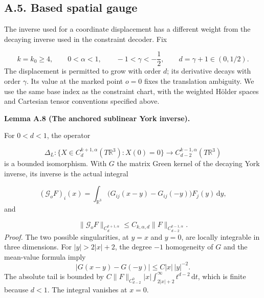 \documentclass[
  english,
  11pt,
  reqno]{amsart}
\makeatletter
\newcommand{\pandocstatementheading}[1]{%
  \par\addpenalty{\@beginparpenalty}%
  \addvspace{.5\baselineskip plus .2\baselineskip minus .2\baselineskip}%
  {\normalfont\bfseries #1\par}%
  \nobreak\@afterindenttrue\@afterheading
}
\makeatother
\begin{document}
\subsection{A.5. Based spatial gauge}\label{a.5.-based-spatial-gauge}\label{sec:online-anchored-spatial-gauge}

The inverse used for a coordinate displacement has a different weight
from the decaying inverse used in the constraint decoder. Fix

\label{eq:online-gauge-fixed-weights} \[
k=k_0\ge4,\qquad 0<\alpha<1,\qquad -1<\gamma<-\frac12,
\qquad d=\gamma+1\in(0,1/2).
\] The displacement is permitted to grow with order \(d\); its
derivative decays with order \(\gamma\). Its value at the marked point
\(o=0\) fixes the translation ambiguity. We use the same base index as
the constraint chart, with the weighted Hölder spaces and Cartesian
tensor conventions specified above.

\pandocstatementheading{\leavevmode{}\label{lem:online-gauge-anchored-york-inverse}Lemma A.8 (The anchored sublinear York inverse).}

For \(0<d<1\), the operator

\label{eq:online-gauge-anchored-isomorphism} \[
\Delta_L:
\{X\in C^{k+1,\alpha}_d(T\mathbb R^3):X(0)=0\}
\longrightarrow C^{k-1,\alpha}_{d-2}(T\mathbb R^3)
\] is a bounded isomorphism. With \(G\) the matrix Green kernel of the
decaying York inverse, its inverse is the actual integral

\label{eq:online-gauge-anchored-kernel} \[
(\mathcal G_oF)_i(x)
=\int_{\mathbb R^3}
\bigl(G_{ij}(x-y)-G_{ij}(-y)\bigr)F_j(y)\,\mathrm dy,
\] and

\label{eq:online-gauge-anchored-bound} \[
\|\mathcal G_oF\|_{C^{k+1,\alpha}_d}
\le C_{k,\alpha,d}\|F\|_{C^{k-1,\alpha}_{d-2}}.
\] \emph{Proof.} The two possible singularities, at \(y=x\) and \(y=0\),
are locally integrable in three dimensions. For \(|y|>2|x|+2\), the
degree \(-1\) homogeneity of \(G\) and the mean-value formula imply \[
|G(x-y)-G(-y)|\le C|x|\,|y|^{-2}.
\] The absolute tail is bounded by
\(C\|F\|_{C^0_{d-2}}|x|\int_{2|x|+2}^{\infty}t^{d-2}\,\mathrm dt\),
which is finite because \(d<1\). The integral vanishes at \(x=0\).
\end{document}
